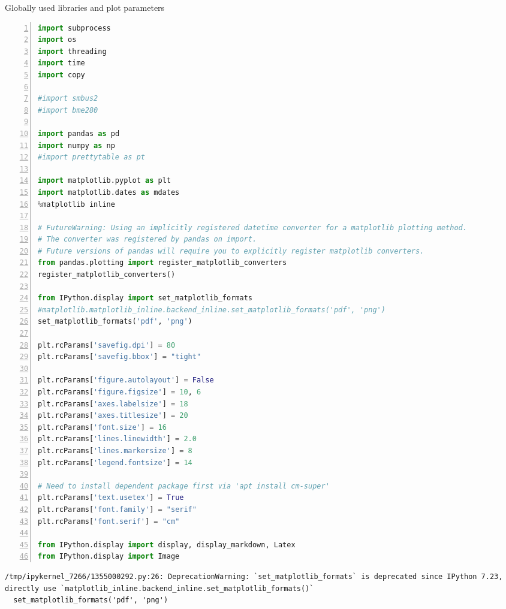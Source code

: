 \documentclass[10pt,parskip=half,
toc=sectionentrywithdots,
bibliography=totocnumbered,
captions=tableheading,numbers=noendperiod]{scrartcl}
\begin{document}
\begin{codecell}[H]
\caption{Globally used libraries and plot parameters}
\label{code:libraries_global}
\begin{lstlisting}[language=Python,numbers=left,xleftmargin=20pt,xrightmargin=5pt,belowskip=5pt,aboveskip=5pt]
import subprocess
import os
import threading
import time
import copy

#import smbus2
#import bme280

import pandas as pd
import numpy as np
#import prettytable as pt

import matplotlib.pyplot as plt
import matplotlib.dates as mdates
%matplotlib inline

# FutureWarning: Using an implicitly registered datetime converter for a matplotlib plotting method.
# The converter was registered by pandas on import.
# Future versions of pandas will require you to explicitly register matplotlib converters.
from pandas.plotting import register_matplotlib_converters
register_matplotlib_converters()

from IPython.display import set_matplotlib_formats
#matplotlib.matplotlib_inline.backend_inline.set_matplotlib_formats('pdf', 'png')
set_matplotlib_formats('pdf', 'png')

plt.rcParams['savefig.dpi'] = 80
plt.rcParams['savefig.bbox'] = "tight"

plt.rcParams['figure.autolayout'] = False
plt.rcParams['figure.figsize'] = 10, 6
plt.rcParams['axes.labelsize'] = 18
plt.rcParams['axes.titlesize'] = 20
plt.rcParams['font.size'] = 16
plt.rcParams['lines.linewidth'] = 2.0
plt.rcParams['lines.markersize'] = 8
plt.rcParams['legend.fontsize'] = 14

# Need to install dependent package first via 'apt install cm-super'
plt.rcParams['text.usetex'] = True
plt.rcParams['font.family'] = "serif"
plt.rcParams['font.serif'] = "cm"

from IPython.display import display, display_markdown, Latex
from IPython.display import Image
\end{lstlisting}\end{codecell}

\begin{lstlisting}[language={},postbreak={},numbers=none,xrightmargin=7pt,belowskip=5pt,aboveskip=5pt,breakindent=0pt]
/tmp/ipykernel_7266/1355000292.py:26: DeprecationWarning: `set_matplotlib_formats` is deprecated since IPython 7.23, directly use `matplotlib_inline.backend_inline.set_matplotlib_formats()`
  set_matplotlib_formats('pdf', 'png')

\end{lstlisting}
\end{document}
